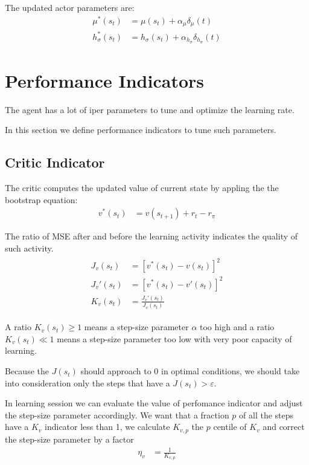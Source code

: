 \documentclass[]{article}
\begin{document}
The updated actor parameters are:
\begin{align}
	\mu^*(s_t)&			= \mu(s_t) + \alpha_\mu \delta_\mu(t)
	\\
	h^*_\sigma(s_t)&	= h_\sigma(s_t) + \alpha_{h_\sigma} \delta_{h_\sigma}(t)
\end{align}
\section{Performance Indicators}

The agent has a lot of iper parameters to tune and optimize the learning rate.

In this section we define performance indicators to tune such  parameters.

\subsection{Critic Indicator}

The critic computes the updated value of current state by appling the the bootstrap equation:
\begin{align*}
	v^*(s_t)&	= v(s_{t+1}) + r_t - r_\pi 
\end{align*}

The ratio of MSE after and before the learning activity indicates the quality of such activity.
\begin{align}
\begin{split}
	J_v(s_t)&	= [ v^*(s_t) - v(s_t) ]^2
	\\
	J_v'(s_t)&	= [v^*(s_t) - v'(s_t)]^2
	\\
	K_v(s_t)&	= \frac{J_v'(s_t)}{J_v(s_t)}
\end{split}
\end{align}

A ratio $ K_v(s_t) \ge 1 $ means a step-size parameter $ \alpha $ too high and a ratio $ K_v(s_t) \ll 1 $  means a step-size parameter too low with very poor capacity of learning.

Because the $ J(s_t) $ should approach to $ 0 $ in optimal conditions, we should take into consideration only the steps that have a $ J(s_t) > \varepsilon $.

In learning session we can evaluate the value of perfomance indicator and adjust the step-size parameter accordingly.
We want that a fraction $ p $ of all the steps have a $ K_v $ indicator less than 1, we calculate $	K_{v,p} $ the $ p $ centile of $ K_v $ and correct the step-size parameter by a factor
\begin{align}
	\eta_v&	= \frac{1}{K_{v,p}}
\end{align}
\end{document}
